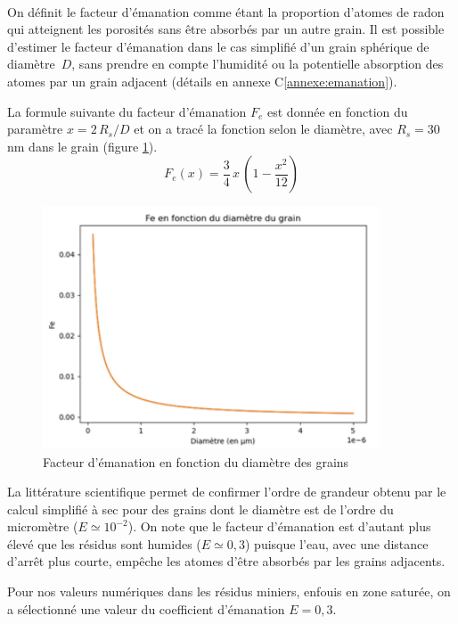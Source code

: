 \documentclass{article}
\begin{document}
\paragraph{} On définit le facteur d’émanation comme étant la proportion d’atomes de radon qui atteignent les porosités sans être absorbés par un autre grain. Il est possible d’estimer le facteur d’émanation \cite{fleischer_theory_1983} dans le cas simplifié d’un grain sphérique de diamètre~$D$, sans prendre en compte l’humidité ou la potentielle absorption des atomes par un grain adjacent (détails en annexe C\ref{annexe:emanation}). 

La formule suivante du facteur d'émanation $F_e$ est donnée en fonction du paramètre $x=2\,R_s/D$ et on a tracé la fonction selon le diamètre, avec $R_s=30$ nm dans le grain (figure \ref{fig:facteur_emanation}).
$$
F_e (x)= \frac{3}{4} \,x\,(1- \frac{x^2}{12} )
$$

\begin{figure}[H]
    \centering
    \includegraphics[width=10cm]{II_A2_2.png}
    \caption{Facteur d’émanation en fonction du diamètre des grains}
    \label{fig:facteur_emanation}
\end{figure}

La littérature scientifique \cite{ferry_migration_2000} permet de confirmer l’ordre de grandeur obtenu par le calcul simplifié à sec pour des grains dont le diamètre est de l’ordre du micromètre ($E \simeq 10^{-2}$). On note que le facteur d’émanation est d’autant plus élevé que les résidus sont humides ($E\simeq 0,3$) puisque l’eau, avec une distance d’arrêt plus courte, empêche les atomes d’être absorbés par les grains adjacents.

Pour nos valeurs numériques dans les résidus miniers, enfouis en zone saturée, on a sélectionné une valeur du coefficient d’émanation $E=0,3$.
\end{document}
